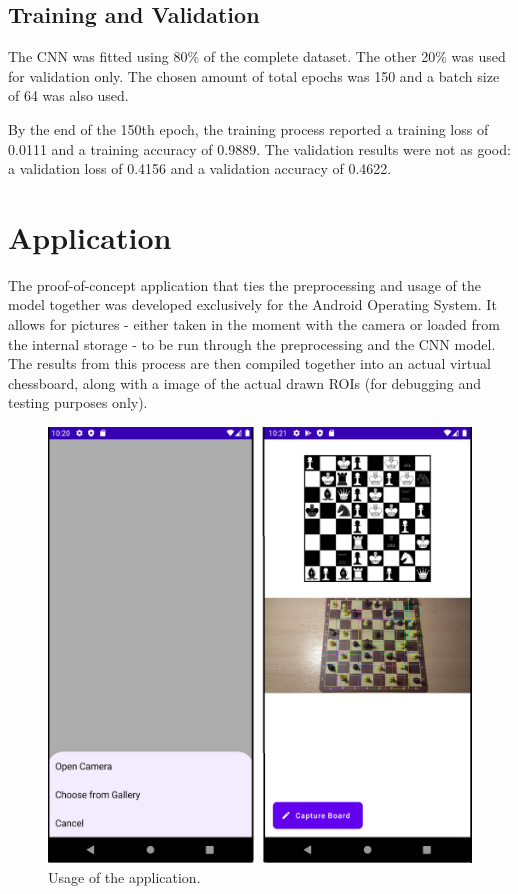 \documentclass[10pt]{article}
\begin{document}
\subsection{Training and Validation}

The CNN was fitted using 80\% of the complete dataset. The other 20\% was used for validation only. The chosen amount of total epochs was 150 and a batch size of 64 was also used.

By the end of the 150th epoch, the training process reported a training loss of 0.0111 and a training accuracy of 0.9889. The validation results were not as good: a validation loss of 0.4156 and a validation accuracy of 0.4622.

\pagebreak

\section{Application}

The proof-of-concept application that ties the preprocessing and usage of the model together was developed exclusively for the Android Operating System. It allows for pictures - either taken in the moment with the camera or loaded from the internal storage - to be run through the preprocessing and the CNN model. The results from this process are then compiled together into an actual virtual chessboard, along with a image of the actual drawn ROIs (for debugging and testing purposes only).

\begin{figure}[H]
	\centering
	\includegraphics[scale=0.4]{usage}
	\caption{Usage of the application.}\label{fig:usage}
\end{figure}
\end{document}
